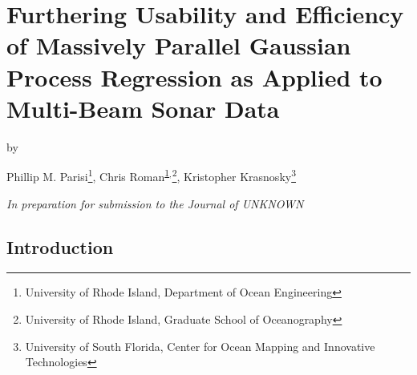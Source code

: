 \chapter{Furthering Usability and Efficiency of Massively Parallel Gaussian Process Regression as Applied to Multi-Beam Sonar Data}

\begin{centering} 

\vspace{.5in}

by 

\vspace{.5in}

Phillip M. Parisi\footnote{\label{note1} University of Rhode Island, Department of Ocean Engineering},
Chris Roman\textsuperscript{\ref{note1}}$^{,}$\footnote{\label{note2} University of Rhode Island, Graduate School of Oceanography},
Kristopher Krasnosky\footnote{\label{note3} University of South Florida, Center for Ocean Mapping and Innovative Technologies}


\vspace{1in}

\textit{In preparation for submission to the Journal of UNKNOWN}

\end{centering}

\newpage

\section{Introduction}

